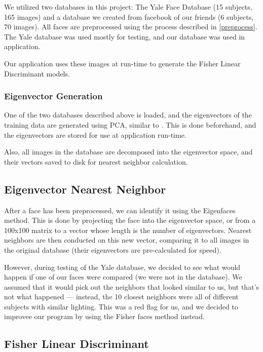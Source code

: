 We utilized two databases in this project: The Yale Face Database
\cite{YaleFace} (15 subjects, 165 images) and a database we created
from facebook of our friends (6 subjects, 70 images).  All faces are
preprocessed using the process described in \ref{preprocess}.  The
Yale database was used mostly for testing, and our database was used
in application.

Our application uses these images at run-time to generate the Fisher
Linear Discriminant models.

\subsubsection{Eigenvector Generation}

One of the two databases described above is loaded, and the
eigenvectors of the training data are generated using PCA, similar to
\cite{Eigenfaces}.  This is done beforehand, and the eigenvectors are
stored for use at application run-time.

Also, all images in the database are decomposed into the eigenvector
space, and their vectors saved to disk for nearest neighbor
calculation.

\subsection{Eigenvector Nearest Neighbor}

After a face has been preprocessed, we can identify it using the
Eigenfaces method.  This is done by projecting the face into the
eigenvector space, or from a 100x100 matrix to a vector whose length
is the number of eigenvectors.  Nearest neighbors are then conducted
on this new vector, comparing it to all images in the original
database (their eigenvectors are pre-calculated for speed).

However, during testing of the Yale database, we decided to see what
would happen if one of our faces were compared (we were not in the
database).  We assumed that it would pick out the neighbors that
looked similar to us, but that's not what happened --- instead, the 10
closest neighbors were all of different subjects with similar
lighting.  This was a red flag for us, and we decided to improvee our
program by using the Fisher faces method instead.



\subsection{Fisher Linear Discriminant}

